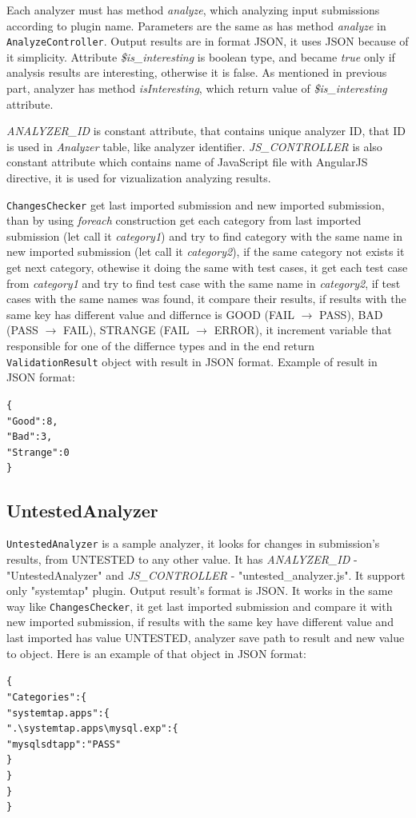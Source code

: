 Each analyzer must has method \emph{analyze}, which analyzing input submissions according to plugin name. Parameters are the same as has method \emph{analyze} in \texttt{AnalyzeController}. Output results are in format JSON, it uses JSON because of it simplicity. Attribute \emph{\$is\_interesting} is boolean type, and became \emph{true} only if analysis results are interesting, otherwise it is false. As mentioned in previous part, analyzer has method \emph{isInteresting}, which return value of \emph{\$is\_interesting} attribute.

\emph{ANALYZER\_ID} is constant attribute, that contains unique analyzer ID, that ID is used in \emph{Analyzer} table, like analyzer identifier. \emph{JS\_CONTROLLER} is also constant attribute which contains name of JavaScript file with AngularJS directive, it is used for vizualization analyzing results.

\texttt{ChangesChecker} get last imported submission and new imported submission, than by using \emph{foreach} construction get each category from last imported submission (let call it \emph{category1}) and try to find category with the same name in new imported submission (let call it \emph{category2}), if the same category not exists it get next category, othewise it doing the same with test cases, it get each test case from \emph{category1} and try to find test case with the same name in \emph{category2}, if test cases with the same names was found, it compare their results, if results with the same key has different value and differnce is GOOD (FAIL $\rightarrow$ PASS), BAD (PASS $\rightarrow$ FAIL), STRANGE (FAIL $\rightarrow$ ERROR), it increment variable that responsible for one of the differnce types and in the end return \texttt{ValidationResult} object with result in JSON format. Example of result in JSON format:
\begin{alltt}
\{
    "Good": 8,
    "Bad": 3,
    "Strange": 0
\}
\end{alltt}

\subsection{UntestedAnalyzer}

\texttt{UntestedAnalyzer} is a sample analyzer, it looks for changes in submission's results, from UNTESTED to any other value. It has \emph{ANALYZER\_ID} - "UntestedAnalyzer" and \emph{JS\_CONTROLLER} - "untested\_analyzer.js". It support only "systemtap" plugin. Output result's format is JSON. It works in the same way like \texttt{ChangesChecker}, it get last imported submission and compare it with new imported submission, if results with the same key have different value and last imported has value UNTESTED, analyzer save path to result and new value to object. Here is an example of that object in JSON format:
\begin{alltt}
\{
    "Categories": \{
        "systemtap.apps": \{
            ".\textbackslash{}systemtap.apps\textbackslash{}mysql.exp": \{
                "mysql sdt app": "PASS"
            \}
        \}
    \}
\}
\end{alltt}


